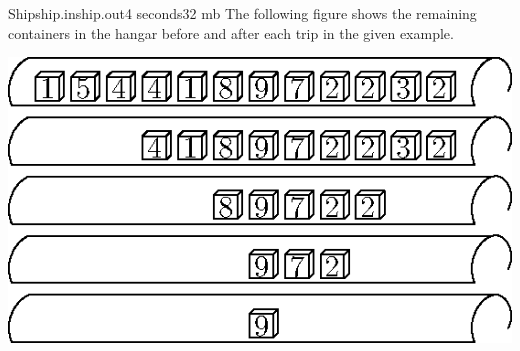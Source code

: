 \begin{problem}{Ship}{ship.in}{ship.out}{4 seconds}{32 mb}{}
\Note
The following figure shows the remaining containers in the hangar before and after each trip in the given example.
\begin{center}
\includegraphics[bb = 60 0 140 120]{pics/figure.eps}
\end{center}

\end{problem}
